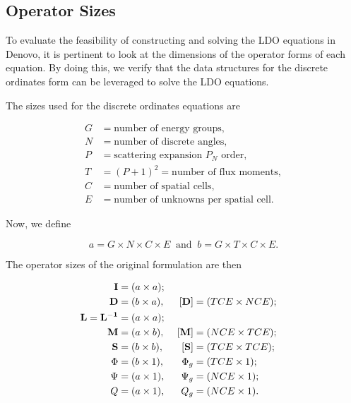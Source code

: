 \subsection{Operator Sizes}

To evaluate the feasibility of constructing and solving the LDO equations in Denovo, it
is pertinent to look at the dimensions of the operator forms of each equation. By doing
this, we verify that the data structures for the discrete ordinates form can be 
leveraged to solve the LDO equations.

\newpage

The sizes used for the discrete ordinates equations are

\begin{equation*}
  \begin{aligned}
    G &= \text{number of energy groups},\\
    N &= \text{number of discrete angles},\\
    P &= \text{scattering expansion $P_N$ order},\\
    T &= (P+1)^2 = \text{number of flux moments},\\
    C &= \text{number of spatial cells},\\
    E &= \text{number of unknowns per spatial cell}.
  \end{aligned}
\end{equation*}

\noindent Now, we define

\begin{equation}
  a = G \times N \times C \times E\ \text{ and }\
  b = G \times T \times C \times E.
\label{eq:dims}
\end{equation}

\noindent The operator sizes of the original formulation are then

\begin{alignat*}{3}
\mathbf{I} &= (a \times a);  \\
\mathbf{D} &= (b \times a),\ &[\mathbf{D}] &= (TCE \times NCE); \\
\mathbf{L} = \mathbf{L^{-1}} &= (a \times a);  \\
\mathbf{M} &= (a \times b),\ &[\mathbf{M}] &= (NCE \times TCE); \\
\mathbf{S} &= (b \times b),\ &[\mathbf{S}] &= (TCE \times TCE); \\
\Phi &= (b \times 1),\   &\Phi_g   &= (TCE \times 1); \\
\Psi &= (a \times 1),\   &\Psi_g   &= (NCE \times 1); \\
Q &= (a \times 1),\      &Q_g      &= (NCE \times 1).
\end{alignat*}

